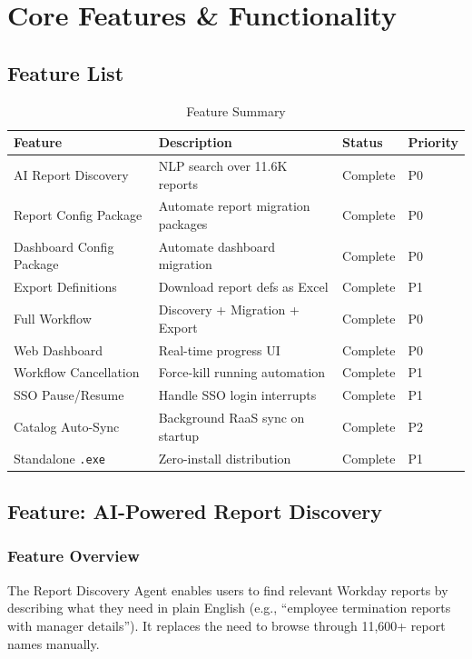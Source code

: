 \documentclass[12pt,a4paper]{article}
\begin{document}
\section{Core Features \& Functionality}
\label{sec:features}

\subsection{Feature List}
\label{subsec:feature-list}

\begin{table}[H]
\centering
\caption{Feature Summary}
\label{tab:features}
\begin{tabularx}{\textwidth}{l X l l}
\toprule
\textbf{Feature} & \textbf{Description} & \textbf{Status} & \textbf{Priority} \\
\midrule
AI Report Discovery & NLP search over 11.6K reports & Complete & P0 \\
Report Config Package & Automate report migration packages & Complete & P0 \\
Dashboard Config Package & Automate dashboard migration & Complete & P0 \\
Export Definitions & Download report defs as Excel & Complete & P1 \\
Full Workflow & Discovery + Migration + Export & Complete & P0 \\
Web Dashboard & Real-time progress UI & Complete & P0 \\
Workflow Cancellation & Force-kill running automation & Complete & P1 \\
SSO Pause/Resume & Handle SSO login interrupts & Complete & P1 \\
Catalog Auto-Sync & Background RaaS sync on startup & Complete & P2 \\
Standalone \texttt{.exe} & Zero-install distribution & Complete & P1 \\
\bottomrule
\end{tabularx}
\end{table}

\subsection{Feature: AI-Powered Report Discovery}
\label{subsec:feature-discovery}

\subsubsection{Feature Overview}
The Report Discovery Agent enables users to find relevant Workday reports by describing what they need in plain English (e.g., ``employee termination reports with manager details''). It replaces the need to browse through 11,600+ report names manually.
\end{document}
